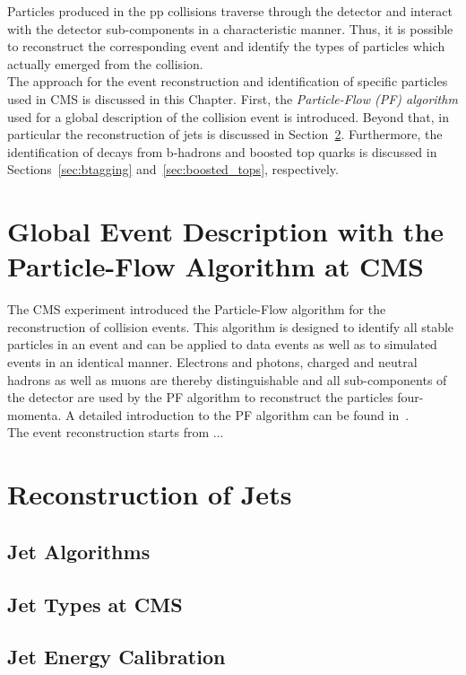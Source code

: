 Particles produced in the pp collisions traverse through the detector and interact with the detector sub-components in a characteristic manner. Thus, it is possible to reconstruct the corresponding event and identify the types of particles which actually emerged from the collision. \\
The approach for the event reconstruction and identification of specific particles used in CMS is discussed in this Chapter. First, the \textit{Particle-Flow (PF) algorithm} used for a global description of the collision event is introduced. Beyond that, in particular the reconstruction of jets is discussed in Section~\ref{sec:jets_reco}. Furthermore, the identification of decays from b-hadrons and boosted top quarks is discussed in Sections~\ref{sec:btagging} and~\ref{sec:boosted_tops}, respectively.
\section{Global Event Description with the Particle-Flow Algorithm at CMS}
\label{sec:pf_algo}
The CMS experiment introduced the Particle-Flow algorithm for the reconstruction of collision events. This algorithm is designed to identify all stable particles in an event and can be applied to data events as well as to simulated events in an identical manner. Electrons and photons, charged and neutral hadrons as well as muons are thereby distinguishable and all sub-components of the detector are used by the PF algorithm to reconstruct the particles four-momenta. A detailed introduction to the PF algorithm can be found in~\cite{CMS-PAS-PFT-09-001}. \\ 
The event reconstruction starts from ...
\section{Reconstruction of Jets}
\label{sec:jets_reco}

\subsection{Jet Algorithms}
\label{subsec:jets_algos}

\subsection{Jet Types at CMS}
\label{subsec:jets_types}

\subsection{Jet Energy Calibration}
\label{subsec:jets_calib}

